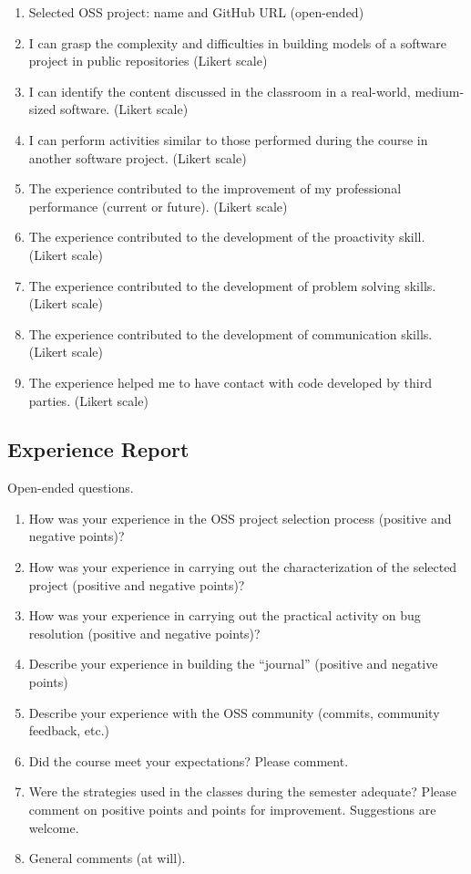 \begin{enumerate}
    \item Selected OSS project: name and GitHub URL (open-ended)
    \item I can grasp the complexity and difficulties in building models of a software project in public repositories (Likert scale)
    \item I can identify the content discussed in the classroom in a real-world, medium-sized software. (Likert scale)
    \item I can perform activities similar to those performed during the course in another software project. (Likert scale)
    \item The experience contributed to the improvement of my professional performance (current or future). (Likert scale)
    \item The experience contributed to the development of the proactivity skill. (Likert scale)
    \item The experience contributed to the development of problem solving skills. (Likert scale)
    \item The experience contributed to the development of communication skills. (Likert scale)
    \item The experience helped me to have contact with code developed by third parties. (Likert scale)
\end{enumerate}

\subsection{Experience Report}

Open-ended questions.

\begin{enumerate}
\item How was your experience in the OSS project selection process (positive and negative points)?

\item How was your experience in carrying out the characterization of the selected project (positive and negative points)?

\item How was your experience in carrying out the practical activity on bug resolution (positive and negative points)?

\item Describe your experience in building the ``journal'' (positive and negative points) 

\item Describe your experience with the OSS community (commits, community feedback, etc.)

\item Did the course meet your expectations? Please comment.

\item Were the strategies used in the classes during the semester adequate? Please comment on positive points and points for improvement. Suggestions are welcome.

\item General comments (at will).

\end{enumerate}
